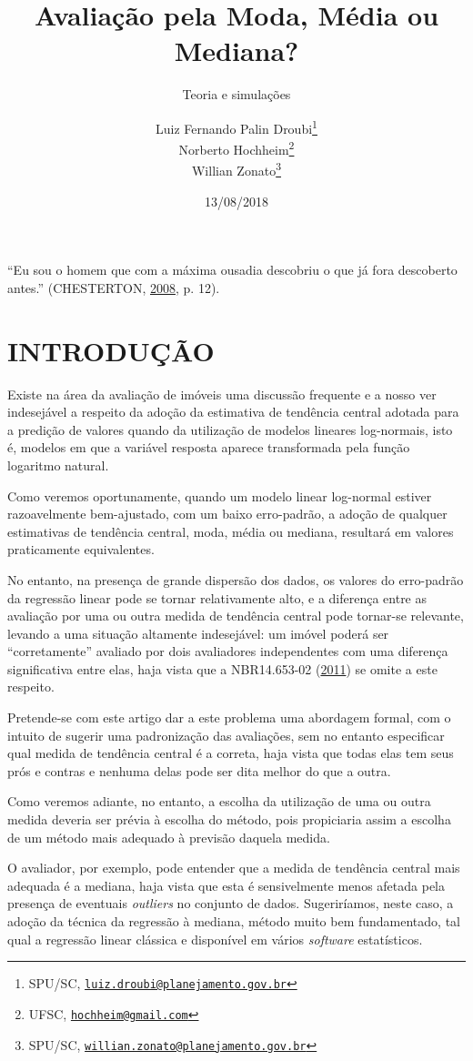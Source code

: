 \documentclass[a4paper, 12pt]{article}
\title{Avaliação pela Moda, Média ou Mediana?}
\subtitle{Teoria e simulações}
\author{Luiz Fernando Palin Droubi\footnote{SPU/SC,
  \href{mailto:luiz.droubi@planejamento.gov.br}{\nolinkurl{luiz.droubi@planejamento.gov.br}}} \\ Norberto Hochheim\footnote{UFSC,
  \href{mailto:hochheim@gmail.com}{\nolinkurl{hochheim@gmail.com}}} \\ Willian Zonato\footnote{SPU/SC,
  \href{mailto:willian.zonato@planejamento.gov.br}{\nolinkurl{willian.zonato@planejamento.gov.br}}}}
\date{13/08/2018}
\begin{document}
\maketitle

``Eu sou o homem que com a máxima ousadia descobriu o que já fora
descoberto antes.'' (CHESTERTON,
\protect\hyperlink{ref-gkchesterton}{2008}, p. 12).

\section{INTRODUÇÃO}\label{introducao}

Existe na área da avaliação de imóveis uma discussão frequente e a nosso
ver indesejável a respeito da adoção da estimativa de tendência central
adotada para a predição de valores quando da utilização de modelos
lineares log-normais, isto é, modelos em que a variável resposta aparece
transformada pela função logaritmo natural.

Como veremos oportunamente, quando um modelo linear log-normal estiver
razoavelmente bem-ajustado, com um baixo erro-padrão, a adoção de
qualquer estimativas de tendência central, moda, média ou mediana,
resultará em valores praticamente equivalentes.

No entanto, na presença de grande dispersão dos dados, os valores do
erro-padrão da regressão linear pode se tornar relativamente alto, e a
diferença entre as avaliação por uma ou outra medida de tendência
central pode tornar-se relevante, levando a uma situação altamente
indesejável: um imóvel poderá ser ``corretamente'' avaliado por dois
avaliadores independentes com uma diferença significativa entre elas,
haja vista que a NBR14.653-02 (\protect\hyperlink{ref-NBR1465302}{2011})
se omite a este respeito.

Pretende-se com este artigo dar a este problema uma abordagem formal,
com o intuito de sugerir uma padronização das avaliações, sem no entanto
especificar qual medida de tendência central é a correta, haja vista que
todas elas tem seus prós e contras e nenhuma delas pode ser dita melhor
do que a outra.

Como veremos adiante, no entanto, a escolha da utilização de uma ou
outra medida deveria ser prévia à escolha do método, pois propiciaria
assim a escolha de um método mais adequado à previsão daquela medida.

O avaliador, por exemplo, pode entender que a medida de tendência
central mais adequada é a mediana, haja vista que esta é sensivelmente
menos afetada pela presença de eventuais \emph{outliers} no conjunto de
dados. Sugeriríamos, neste caso, a adoção da técnica da regressão à
mediana, método muito bem fundamentado, tal qual a regressão linear
clássica e disponível em vários \emph{software} estatísticos.
\end{document}
